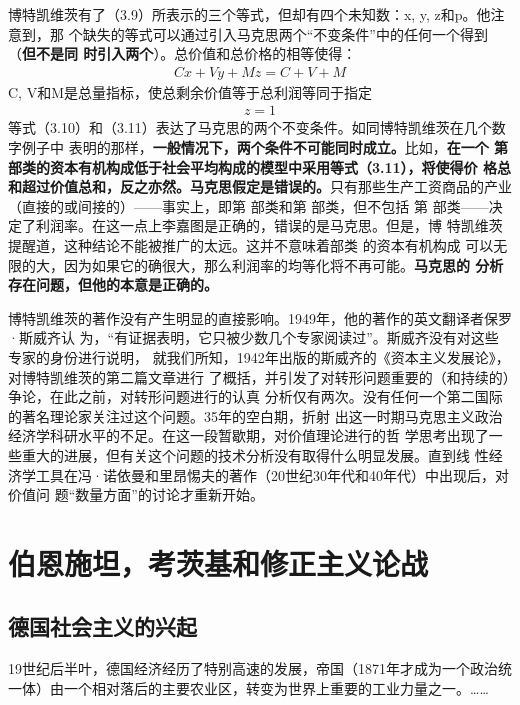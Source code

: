 博特凯维茨有了（3.9）所表示的三个等式，但却有四个未知数：x, y, z和p。他注意到，那
个缺失的等式可以通过引入马克思两个“不变条件”中的任何一个得到（\textbf{但不是同
  时引入两个}）。总价值和总价格的相等使得：
\begin{gather}
  Cx + Vy + Mz = C+V+M
\end{gather}
C, V和M是总量指标，使总剩余价值等于总利润等同于指定
\begin{gather}
  z = 1
\end{gather}
等式（3.10）和（3.11）表达了马克思的两个不变条件。如同博特凯维茨在几个数字例子中
表明的那样，\textbf{一般情况下，两个条件不可能同时成立。}比如，\textbf{在一个
  第 部类的资本有机构成低于社会平均构成的模型中采用等式（3.11），将使得价
  格总和超过价值总和，反之亦然。马克思假定是错误的。}只有那些生产工资商品的产业
（直接的或间接的）——事实上，即第 部类和第 部类，但不包括
第 部类——决定了利润率。在这一点上李嘉图是正确的，错误的是马克思。但是，博
特凯维茨提醒道，这种结论不能被推广的太远。这并不意味着部类 的资本有机构成
可以无限的大，因为如果它的确很大，那么利润率的均等化将不再可能。\textbf{马克思的
  分析存在问题，但他的本意是正确的。}

博特凯维茨的著作没有产生明显的直接影响。1949年，他的著作的英文翻译者保罗·斯威齐认
为，“有证据表明，它只被少数几个专家阅读过”。斯威齐没有对这些专家的身份进行说明，
就我们所知，1942年出版的斯威齐的《资本主义发展论》，对博特凯维茨的第二篇文章进行
了概括，并引发了对转形问题重要的（和持续的）争论，在此之前，对转形问题进行的认真
分析仅有两次。没有任何一个第二国际的著名理论家关注过这个问题。35年的空白期，折射
出这一时期马克思主义政治经济学科研水平的不足。在这一段暂歇期，对价值理论进行的哲
学思考出现了一些重大的进展，但有关这个问题的技术分析没有取得什么明显发展。直到线
性经济学工具在冯·诺依曼和里昂惕夫的著作（20世纪30年代和40年代）中出现后，对价值问
题“数量方面”的讨论才重新开始。

\chapter{伯恩施坦，考茨基和修正主义论战}

\section{德国社会主义的兴起}
19世纪后半叶，德国经济经历了特别高速的发展，帝国（1871年才成为一个政治统一体）由一个相对落后的主要农业区，转变为世界上重要的工业力量之一。……


